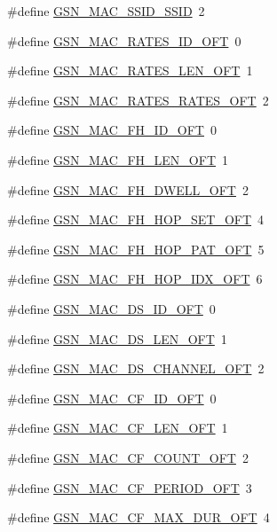 \begin{DoxyCompactItemize}
\item 
\#define \hyperlink{a00523_aa4e79dcd7015cc342c8d57893a7cd0fc}{GSN\_\-MAC\_\-SSID\_\-SSID}~2
\item 
\#define \hyperlink{a00523_a5c10f5090b57c08263ce16389c3cb330}{GSN\_\-MAC\_\-RATES\_\-ID\_\-OFT}~0
\item 
\#define \hyperlink{a00523_a8207acc5c03dd459fc977bbf2164150e}{GSN\_\-MAC\_\-RATES\_\-LEN\_\-OFT}~1
\item 
\#define \hyperlink{a00523_a61d97f4b24228df313ef32b9f13e0139}{GSN\_\-MAC\_\-RATES\_\-RATES\_\-OFT}~2
\item 
\#define \hyperlink{a00523_ada2cf57e63cf13150fd4d2a732fc9962}{GSN\_\-MAC\_\-FH\_\-ID\_\-OFT}~0
\item 
\#define \hyperlink{a00523_a01c1644294a4c35e6f04d438a1f3a0bf}{GSN\_\-MAC\_\-FH\_\-LEN\_\-OFT}~1
\item 
\#define \hyperlink{a00523_a129fee36639b17d10ac7e7dce4b7c298}{GSN\_\-MAC\_\-FH\_\-DWELL\_\-OFT}~2
\item 
\#define \hyperlink{a00523_a2d15f4295e77b739635f86e495a79ab6}{GSN\_\-MAC\_\-FH\_\-HOP\_\-SET\_\-OFT}~4
\item 
\#define \hyperlink{a00523_ab89a5bf1506d43e87905502d26e73dad}{GSN\_\-MAC\_\-FH\_\-HOP\_\-PAT\_\-OFT}~5
\item 
\#define \hyperlink{a00523_a7df9e04a96bb646538368bb99992b13b}{GSN\_\-MAC\_\-FH\_\-HOP\_\-IDX\_\-OFT}~6
\item 
\#define \hyperlink{a00523_af2fff36089d2976d984123b9ca80f73c}{GSN\_\-MAC\_\-DS\_\-ID\_\-OFT}~0
\item 
\#define \hyperlink{a00523_ac0635650a96ae3aa5b508094e113727b}{GSN\_\-MAC\_\-DS\_\-LEN\_\-OFT}~1
\item 
\#define \hyperlink{a00523_a3fe4bf3d3d99ce2767c3f022f1059b89}{GSN\_\-MAC\_\-DS\_\-CHANNEL\_\-OFT}~2
\item 
\#define \hyperlink{a00523_aabe75cd1f04b055917e4c7e0cacb2f4c}{GSN\_\-MAC\_\-CF\_\-ID\_\-OFT}~0
\item 
\#define \hyperlink{a00523_ab48fe2d0b2bfdffa6f83e01f1702a719}{GSN\_\-MAC\_\-CF\_\-LEN\_\-OFT}~1
\item 
\#define \hyperlink{a00523_aed9216d1b3365fd9b606c600539f068c}{GSN\_\-MAC\_\-CF\_\-COUNT\_\-OFT}~2
\item 
\#define \hyperlink{a00523_a95e25f9f091091290acb44b335ff8849}{GSN\_\-MAC\_\-CF\_\-PERIOD\_\-OFT}~3
\item 
\#define \hyperlink{a00523_a4455cd3140dc5fedab387dd70a7d4997}{GSN\_\-MAC\_\-CF\_\-MAX\_\-DUR\_\-OFT}~4

\end{DoxyCompactItemize}
